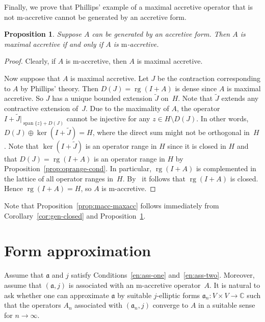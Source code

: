 \documentclass[a4paper,oneside,12pt]{amsart}
\theoremstyle{plain}
\newtheorem{proposition}[theorem]{Proposition}
\theoremstyle{definition}
\begin{document}
Finally, we prove that Phillips' example of a maximal accretive operator that is not {\ensuremath{\text{m}}}-accretive cannot be generated by
an accretive form.
\begin{proposition}\label{prop:phillips}
Suppose $A$ can be generated by an accretive form. Then $A$ is maximal accretive if and only if $A$ is {\ensuremath{\text{m}}}-accretive.
\end{proposition}
\begin{proof}
Clearly, if $A$ is {\ensuremath{\text{m}}}-accretive, then $A$ is maximal accretive.

Now suppose that $A$ is maximal accretive.
Let $J$ be the contraction corresponding to $A$ by Phillips' theory.
Then $D(J)=\operatorname{rg}(I+A)$ is dense since $A$ is maximal accretive.
So $J$ has a unique bounded extension $\tilde{J}$ on~$H$.
Note that $\tilde{J}$ extends any contractive extension of~$J$. 
Due to the maximality of $A$, the operator ${\ensuremath{{I+\tilde{J}}|_{{\operatorname{span}\{z\}+D(J)}}}}$ 
cannot be injective for any $z\in H\setminus D(J)$. In other words, $D(J)\oplus\ker(I+\tilde{J}) = H$, 
where the direct sum might not be orthogonal in~$H$. Note that $\ker(I+\tilde{J})$ is an operator range in $H$ since
it is closed in $H$ and that $D(J)=\operatorname{rg}(I+A)$ is an operator range in $H$ by Proposition~\ref{prop:oprange-cond}. 
In particular, $\operatorname{rg}(I+A)$ is complemented in the lattice of all operator ranges in~$H$. 
By~\cite[Theorem~2.3]{FW71:op-rg} it follows that $\operatorname{rg}(I+A)$ is closed. Hence $\operatorname{rg}(I+A)=H$, so $A$ is {\ensuremath{\text{m}}}-accretive.
\end{proof}
Note that Proposition~\ref{prop:macc-maxacc} follows immediately from Corollary~\ref{cor:gen-closed} and Proposition~\ref{prop:phillips}.

\section{Form approximation}\label{sec:form-approx}

Assume that ${{\mathfrak{{a}}}}$ and $j$ satisfy Conditions~\ref{en:ass-one} and~\ref{en:ass-two}.
Moreover, assume that $({{\mathfrak{{a}}}},j)$ is associated with an {\ensuremath{\text{m}}}-accretive operator~$A$.
It is natural to ask whether one can approximate ${{\mathfrak{{a}}}}$ by suitable $j$-elliptic forms ${{\mathfrak{{a}}}}_n\colon V\times V\to{\mathbb{C}}$ such that the operators $A_n$ associated
with $({{\mathfrak{{a}}}}_n,j)$ converge to $A$ in a suitable sense for $n\to\infty$.
\end{document}
